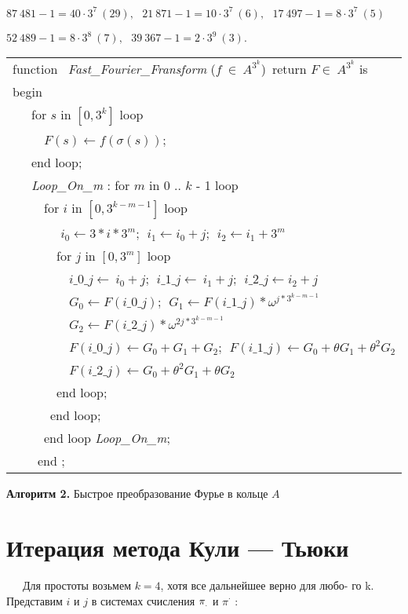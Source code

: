 \documentclass{mai_book}
\begin{document}
$87~481-1=40\cdot 3^7~(29),~~~21~871-1=10\cdot 3^7~(6),~~~17~497-1=8\cdot 3^7~(5)$ 
\begin{center}
$52~489-1=8\cdot 3^8~(7),~~~39~367-1=2\cdot 3^9~(3).$
\end{center}

\newenvironment{ramka}[1]{\begin{tabular}{|p{#1}|} \hline}{\\\hline\end{tabular}}
\begin{ramka}{11cm}
 function ~\textit{Fast\_Fourier\_Fransform}  ($f~\in~A^{3^k}$)~return $F \in~A^{3^k}$ is \\
 begin \\
~~~for $s$ in $[0,3^k]$ loop \\
~~~~~$F(s)\leftarrow f(\sigma(s));$ \\
~~~end loop; \\
~~~\textit{Loop\_On\_m} : for $m$ in 0 .. $k$ - 1 loop \\
~~~~~for $i$ in $[0,3^{k-m-1}]$ loop \\
~~~~~~~ $i_0\leftarrow 3*i*3^m;~~i_1 \leftarrow i_0+j;~~i_2 \leftarrow i_1+3^m $ \\
~~~~~~~for $j$ in $[0,3^m]$ loop \\
~~~~~~~~~$i\_0\_j\leftarrow~i_0+j;~~i\_1\_j\leftarrow~i_1+j;~~i\_2\_j\leftarrow i_2+j$ \\
~~~~~~~~~$G_0\leftarrow F(i\_0\_j);~~G_1\leftarrow F(i\_1\_j)*\omega^{j*3^{k-m-1}}$ \\
~~~~~~~~~$G_2\leftarrow F(i\_2\_j)*\omega^{2j*3^{k-m-1}}$\\
~~~~~~~~~$F(i\_0\_j)\leftarrow G_0+G_1+G_2;~~F(i\_1\_j)\leftarrow G_0+\theta G_1+\theta^2 G_2$ \\
~~~~~~~~~$F(i\_2\_j)\leftarrow G_0+\theta^2 G_1+\theta G_2$ \\
~~~~~~~end loop; \\
~~~~~~end loop; \\
~~~~~end loop \textit{Loop\_On\_m};\\
~~~~end \text{Fast\_Fourier\_Transform}; 
\end{ramka} 
\begin{center}
\textbf{Алгоритм 2.} Быстрое преобразование Фурье в кольце $A$
\end{center}
\section{Итерация метода Кули --- Тьюки} 
\indent~~~Для простоты возьмем $k=4$, хотя все дальнейшее верно для любо-\linebreak
го k. Представим $i$ и $j$ в системах счисления $\pi_{{\Large .}}$ и $\pi^\cdot$ : \\
\end{document}
